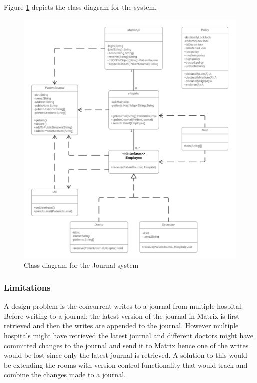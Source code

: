 Figure \ref{fig:journalsystem} depicts the class diagram for the system.


\begin{figure}[H] 
	\hspace*{-1.3cm}
	\centering
	\includegraphics[width=14cm]{figures/journalsystem_class2.png}
	\caption{Class diagram for the Journal system}
	\label{fig:journalsystem}
\end{figure}





\subsubsection{Limitations} \label{concurrentwrites}



A design problem is the concurrent writes to a journal from multiple hospital. Before writing to a journal; the latest version of the journal in Matrix is first retrieved and then the writes are appended to the journal. However multiple hospitals might have retrieved the latest journal and different doctors might have committed changes to the journal and send it to Matrix hence one of the writes would be lost since only the latest journal is retrieved. A solution to this would be extending the rooms with version control functionality that would track and combine the changes made to a journal.


